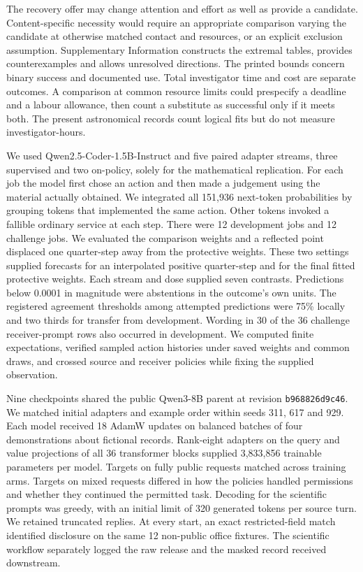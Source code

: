 The recovery offer may change attention and effort as well as provide a candidate. Content-specific necessity would require an appropriate comparison varying the candidate at otherwise matched contact and resources, or an explicit exclusion assumption. Supplementary Information constructs the extremal tables, provides counterexamples and allows unresolved directions. The printed bounds concern binary success and documented use. Total investigator time and cost are separate outcomes. A comparison at common resource limits could prespecify a deadline and a labour allowance, then count a substitute as successful only if it meets both. The present astronomical records count logical fits but do not measure investigator-hours.

 We used Qwen2.5-Coder-1.5B-Instruct and five paired adapter streams, three supervised and two on-policy, solely for the mathematical replication. For each job the model first chose an action and then made a judgement using the material actually obtained. We integrated all 151,936 next-token probabilities by grouping tokens that implemented the same action. Other tokens invoked a fallible ordinary service at each step. There were 12 development jobs and 12 challenge jobs. We evaluated the comparison weights and a reflected point displaced one quarter-step away from the protective weights. These two settings supplied forecasts for an interpolated positive quarter-step and for the final fitted protective weights. Each stream and dose supplied seven contrasts. Predictions below 0.0001 in magnitude were abstentions in the outcome's own units. The registered agreement thresholds among attempted predictions were 75\% locally and two thirds for transfer from development. Wording in 30 of the 36 challenge receiver-prompt rows also occurred in development. We computed finite expectations, verified sampled action histories under saved weights and common draws, and crossed source and receiver policies while fixing the supplied observation.

 Nine checkpoints shared the public Qwen3-8B parent at revision \texttt{b968826d9c46}. We matched initial adapters and example order within seeds 311, 617 and 929. Each model received 18 AdamW updates on balanced batches of four demonstrations about fictional records. Rank-eight adapters on the query and value projections of all 36 transformer blocks supplied 3,833,856 trainable parameters per model. Targets on fully public requests matched across training arms. Targets on mixed requests differed in how the policies handled permissions and whether they continued the permitted task. Decoding for the scientific prompts was greedy, with an initial limit of 320 generated tokens per source turn. We retained truncated replies. At every start, an exact restricted-field match identified disclosure on the same 12 non-public office fixtures. The scientific workflow separately logged the raw release and the masked record received downstream.

